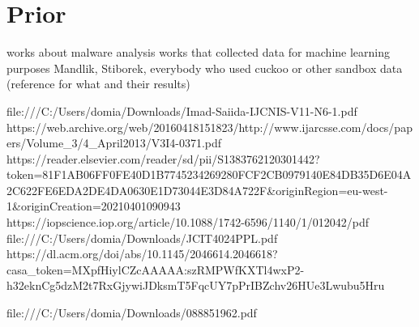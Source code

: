 \section{Prior}
works about malware analysis
works that collected data for machine learning purposes
Mandlik, Stiborek, everybody who used cuckoo or other sandbox data (reference for what and their results)

file:///C:/Users/domia/Downloads/Imad-Saiida-IJCNIS-V11-N6-1.pdf
https://web.archive.org/web/20160418151823/http://www.ijarcsse.com/docs/papers/Volume_3/4_April2013/V3I4-0371.pdf
https://reader.elsevier.com/reader/sd/pii/S1383762120301442?token=81F1AB06FF0FE40D1B7745234269280FCF2CB0979140E84DB35D6E04A2C622FE6EDA2DE4DA0630E1D73044E3D84A722F&originRegion=eu-west-1&originCreation=20210401090943
https://iopscience.iop.org/article/10.1088/1742-6596/1140/1/012042/pdf
file:///C:/Users/domia/Downloads/JCIT4024PPL.pdf
https://dl.acm.org/doi/abs/10.1145/2046614.2046618?casa_token=MXpfHiylCZcAAAAA:szRMPWfKXTl4wxP2-h32eknCg5dzM2t7RxGjywiJDksmT5FqcUY7pPrIBZchv26HUe3Lwubu5Hru

file:///C:/Users/domia/Downloads/088851962.pdf







